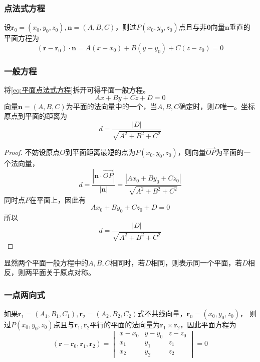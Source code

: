\subsubsection{点法式方程}
设$\bm{r}_0=(x_0,y_0,z_0),\bm{n}=(A,B,C)$，则过$P(x_0,y_0,z_0)$点且与非$\bm{0}$向量$\bm{n}$垂直的平面方程为
\begin{equation}
    \label{eq:平面点法式方程}
    (\bm{r}-\bm{r}_0)\cdot \bm{n} = A(x-x_0) + B(y-y_0) + C(z-z_0) = 0
\end{equation}

\subsubsection{一般方程}
将\ref{eq:平面点法式方程}拆开可得平面一般方程。
\begin{equation}
    \label{eq:平面一般方程}
    Ax + By + Cz + D = 0
\end{equation}
向量$\bm{n}=(A,B,C)$为平面的法向量中的一个，当$A,B,C$确定时，则$D$唯一。坐标原点到平面的距离为
\begin{equation}
    d = \frac{|D|}{\sqrt{A^2+B^2+C^2}}
\end{equation}
\begin{proof}
    不妨设原点$O$到平面距离最短的点为$P(x_0,y_0,z_0)$，则向量$\overrightarrow{OP}$为平面的一个法向量，
    \[
        d
        = \frac{\left|\bm{n}\cdot\overrightarrow{OP}\right|}{|\bm{n}|}
        = \frac{|Ax_0 + By_0 + Cz_0|}{\sqrt{A^2+B^2+C^2}}
    \]
    同时点$P$在平面上，因此有
    \[ Ax_0 + By_0 + Cz_0 + D = 0 \]
    所以
    \[ d= \frac{|D|}{\sqrt{A^2+B^2+C^2}} \]
\end{proof}
显然两个平面一般方程中的$A,B,C$相同时，若$D$相同，则表示同一个平面，若$D$相反，则两平面关于原点对称。

\subsubsection{一点两向式}
如果$\bm{r}_1=(A_1,B_1,C_1),\bm{r}_2=(A_2,B_2,C_2)$式不共线向量，$\bm{r}_0=(x_0,y_0,z_0)$，
则过$P(x_0,y_0,z_0)$点且与$\bm{r}_1,\bm{r}_2$平行的平面的法向量为$\bm{r}_1\times\bm{r}_2$，因此平面方程为
\begin{equation}
    \label{eq:平面一点两向式}
    (\bm{r}-\bm{r}_0,\bm{r}_1,\bm{r}_2)=
    \begin{vmatrix}
        x-x_0 & y-y_0 & z-z_0 \\
        x_1   & y_1   & z_1   \\
        x_2   & y_2   & z_2
    \end{vmatrix}
    =0
\end{equation}


